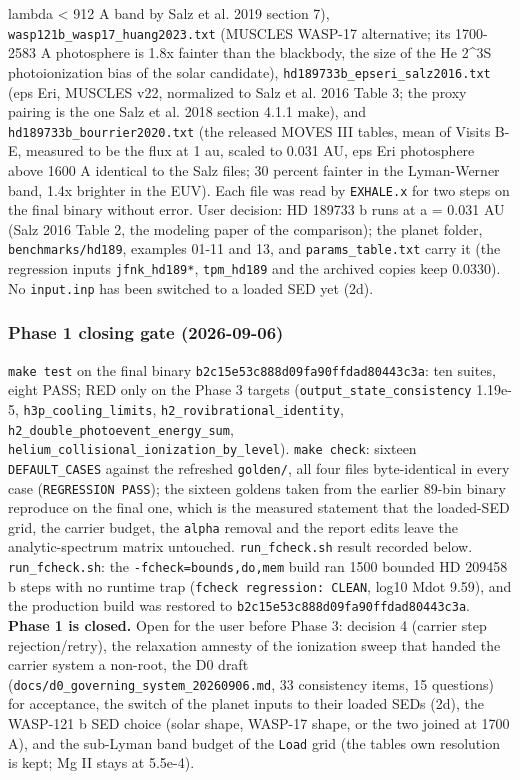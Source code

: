 \documentclass[english,a4paper]{my_memo}
\begin{document}
\begin{itemize}
  lambda \textless{} 912 A band by Salz et al. 2019 section 7),
  \texttt{wasp121b\_wasp17\_huang2023.txt} (MUSCLES WASP-17 alternative; its 1700-2583
  A photosphere is 1.8x fainter than the blackbody, the size of the He 2\^{}3S
  photoionization bias of the solar candidate), \texttt{hd189733b\_epseri\_salz2016.txt}
  (eps Eri, MUSCLES v22, normalized to Salz et al. 2016 Table 3; the proxy
  pairing is the one Salz et al. 2018 section 4.1.1 make), and
  \texttt{hd189733b\_bourrier2020.txt} (the released MOVES III tables, mean of
  Visits B-E, measured to be the flux at 1 au, scaled to 0.031 AU, eps Eri
  photosphere above 1600 A identical to the Salz file\textquotesingle s; 30 percent fainter
  in the Lyman-Werner band, 1.4x brighter in the EUV). Each file was read by
  \texttt{EXHALE.x} for two steps on the final binary without error. User decision:
  HD 189733 b runs at a = 0.031 AU (Salz 2016 Table 2, the modeling paper
  of the comparison); the planet folder, \texttt{benchmarks/hd189}, examples 01-11
  and 13, and \texttt{params\_table.txt} carry it (the regression inputs
  \texttt{jfnk\_hd189*}, \texttt{tpm\_hd189} and the archived copies keep 0.0330). No
  \texttt{input.inp} has been switched to a loaded SED yet (2d).
\end{itemize}

\subsubsection{Phase 1 closing gate (2026-09-06)}\label{phase-1-closing-gate-2026-09-06}

\texttt{make\ test} on the final binary \texttt{b2c15e53c888d09fa90ffdad80443c3a}: ten
suites, eight PASS; RED only on the Phase 3 targets (\texttt{output\_state\_consistency}
1.19e-5, \texttt{h3p\_cooling\_limits}, \texttt{h2\_rovibrational\_identity},
\texttt{h2\_double\_photoevent\_energy\_sum}, \texttt{helium\_collisional\_ionization\_by\_level}).
\texttt{make\ check}: sixteen \texttt{DEFAULT\_CASES} against the refreshed \texttt{golden/}, all
four files byte-identical in every case (\texttt{REGRESSION\ PASS}); the sixteen
goldens taken from the earlier 89-bin binary reproduce on the final one,
which is the measured statement that the loaded-SED grid, the carrier budget,
the \texttt{alpha} removal and the report edits leave the analytic-spectrum matrix
untouched. \texttt{run\_fcheck.sh} result recorded below.
\texttt{run\_fcheck.sh}: the \texttt{-fcheck=bounds,do,mem} build ran 1500 bounded HD 209458 b
steps with no runtime trap (\texttt{fcheck\ regression:\ CLEAN}, log10 Mdot 9.59), and
the production build was restored to \texttt{b2c15e53c888d09fa90ffdad80443c3a}.
\textbf{Phase 1 is closed.} Open for the user before Phase 3: decision 4 (carrier
step rejection/retry), the relaxation amnesty of the ionization sweep that
handed the carrier system a non-root, the D0 draft
(\texttt{docs/d0\_governing\_system\_20260906.md}, 33 consistency items, 15 questions)
for acceptance, the switch of the planet inputs to their loaded SEDs (2d), the
WASP-121 b SED choice (solar shape, WASP-17 shape, or the two joined at 1700 A),
and the sub-Lyman band budget of the \texttt{Load} grid (the table\textquotesingle s own resolution
is kept; Mg II stays at 5.5e-4).
\end{document}
